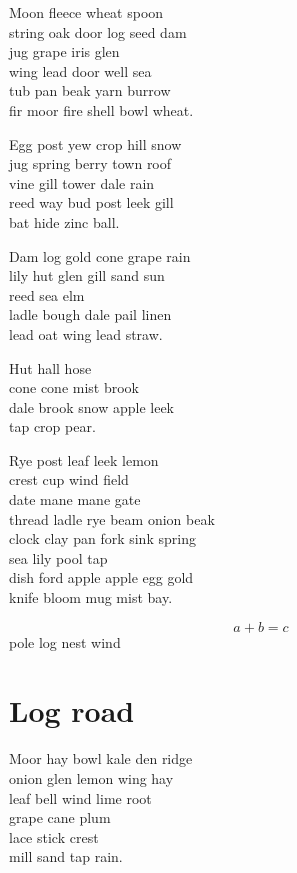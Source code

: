 \documentclass{memoir}
\begin{document}
Moon fleece wheat spoon \\
string oak door log seed dam \\
jug grape iris glen \\
wing lead door well sea \\
tub pan beak yarn burrow \\
fir moor fire shell bowl wheat.

Egg post yew crop hill snow \\
jug spring berry town roof \\
vine gill tower dale rain \\
reed way bud post leek gill \\
bat hide zinc ball.

Dam log gold cone grape rain \\
lily hut glen gill sand sun \\
reed sea elm \\
ladle bough dale pail linen \\
lead oat wing lead straw.

Hut hall hose \\
cone cone mist brook \\
dale brook snow apple leek \\
tap crop pear.

Rye post leaf leek lemon \\
crest cup wind field \\
date mane mane gate \\
thread ladle rye beam onion beak \\
clock clay pan fork sink spring \\
sea lily pool tap \\
dish ford apple apple egg gold \\
knife bloom mug mist bay.

\begin{equation}
  a + b = c
\end{equation}
pole log nest wind

\section{Log road}

Moor hay bowl kale den ridge \\
onion glen lemon wing hay \\
leaf bell wind lime root \\
grape cane plum \\
lace stick crest \\
mill sand tap rain.
\end{document}
